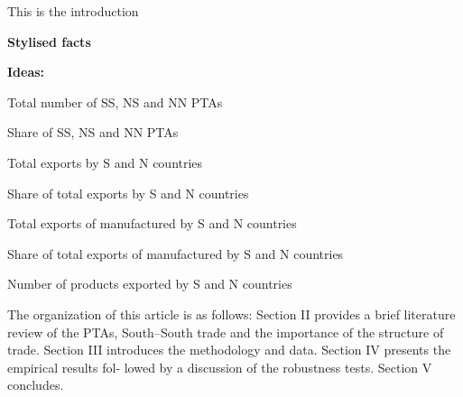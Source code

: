 This is the introduction

\textbf{Stylised facts}

\textbf{Ideas:}

Total number of SS, NS and NN PTAs

Share of SS, NS and NN PTAs

Total exports by S and N countries

Share of total exports by S and N countries

Total exports of manufactured by S and N countries

Share of total exports of manufactured by S and N countries

Number of products exported by S and N countries

The organization of this article is as follows: Section II provides a
brief literature review of the PTAs, South--South trade and the
importance of the structure of trade. Section III introduces the
methodology and data. Section IV presents the empirical results fol-
lowed by a discussion of the robustness tests. Section V concludes.
